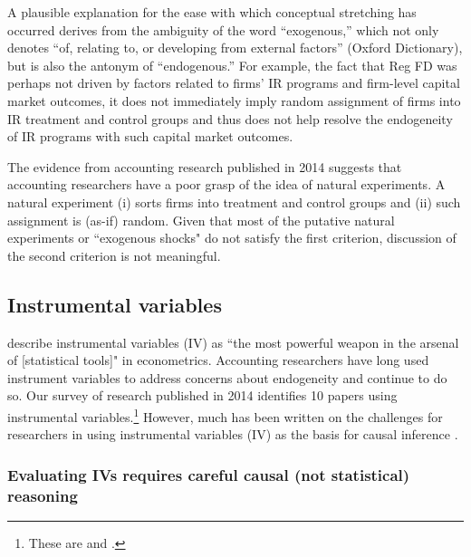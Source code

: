 \documentclass[11pt,reqno]{amsart}
\begin{document}
\begin{doublespace}
A plausible explanation for the ease with which conceptual stretching has occurred derives from the ambiguity of the word ``exogenous,'' which not only denotes  ``of, relating to, or developing from external factors'' (Oxford Dictionary), but is also the antonym of ``endogenous.''
For example, the fact that Reg FD was perhaps not driven by factors related to firms' IR programs and firm-level capital market outcomes, it does not immediately imply random assignment of firms into IR treatment and control groups and thus does not help resolve the endogeneity of IR programs with such capital market outcomes.

The evidence from accounting research published in 2014 suggests that accounting researchers have a poor grasp of the idea of natural experiments.
A natural experiment (i) sorts firms into treatment and control groups and (ii) such assignment is (as-if) random.
Given that most of the putative natural experiments or ``exogenous shocks" do not satisfy the first criterion, discussion of the second criterion is not meaningful.


\subsection{Instrumental variables}
\citet[p.114]{Angrist:2008vk} describe instrumental variables (IV) as ``the most powerful weapon in the arsenal of [statistical tools]" in econometrics. 
Accounting researchers have long used instrument variables to address concerns about endogeneity \citep{Larcker:2010fq} and continue to do so.  Our survey of research published in 2014 identifies 10 papers using instrumental variables.\footnote{These are \citet{Cannon:2014im,Cohen:2014jl,Kim:2014fm,Vermeer:2014bs,Fox:2014io,Guedhami:2013cj,Houston:2014hv,deFranco:2014ct,Erkens:2014hj} and \citet{Correia:2014fp}.}
However, much has been written on the challenges for researchers in using instrumental variables (IV) as the basis for causal inference \citep[e.g.,][]{Roberts:2013cz}. 

\subsubsection{Evaluating IVs requires careful causal (not statistical) reasoning}


\end{doublespace}
\end{document}
